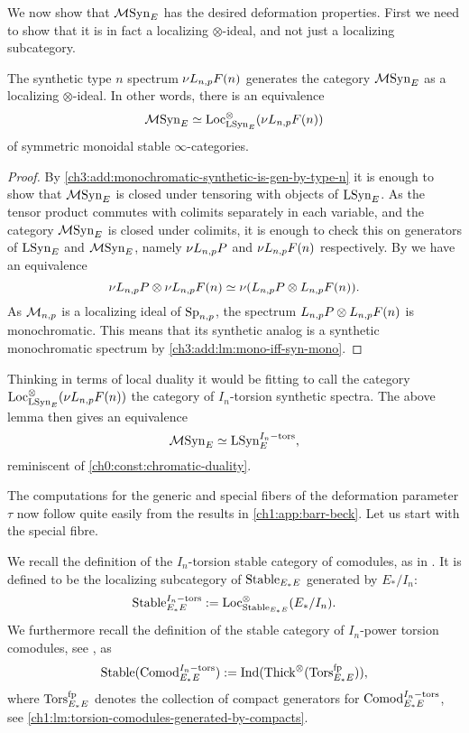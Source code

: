 We now show that $\mathcal{M}\mathrm{Syn}_{E}$ has the desired deformation properties. First we need to show that it is in fact a localizing $\otimes$-ideal, and not just a localizing subcategory. 

\begin{lemma}
    The synthetic type $n$ spectrum $\nu L_{n,p} F(n)$ generates the category $\mathcal{M}\mathrm{Syn}_{E}$ as a localizing $\otimes$-ideal. In other words, there is an equivalence 
    \[\mathcal{M}\mathrm{Syn}_{E} \simeq \operatorname{Loc}_{\mathrm{LSyn}_{E}}^\otimes(\nu L_{n,p} F(n))\] 
    of symmetric monoidal stable $\infty$-categories. 
\end{lemma}
\begin{proof}
    By \cref{ch3:add:monochromatic-synthetic-is-gen-by-type-n} it is enough to show that $\mathcal{M}\mathrm{Syn}_{E}$ is closed under tensoring with objects of $\mathrm{LSyn}_{E}$. As the tensor product commutes with colimits separately in each variable, and the category $\mathcal{M}\mathrm{Syn}_{E}$ is closed under colimits, it is enough to check this on generators of $\mathrm{LSyn}_{E}$ and $\mathcal{M}\mathrm{Syn}_{E}$, namely $\nu L_{n,p} P$ and $\nu L_{n,p} F(n)$ respectively. By \cite[4.24]{pstragowski_2022} we have an equivalence 
    \[\nu L_{n,p} P \otimes \nu L_{n,p} F(n) \simeq \nu(L_{n,p} P \otimes L_{n,p} F(n)).\]
    As $\mathcal{M}_{n,p}$ is a localizing ideal of $\mathrm{Sp}_{n,p}$, the spectrum $L_{n,p} P \otimes L_{n,p} F(n)$ is monochromatic. This means that its synthetic analog is a synthetic monochromatic spectrum by \cref{ch3:add:lm:mono-iff-syn-mono}. 
\end{proof}

\begin{remark}
    Thinking in terms of local duality it would be fitting to call the category $\operatorname{Loc}^\otimes_{\mathrm{LSyn}_{E}}(\nu L_{n,p} F(n))$ the category of $I_n$-torsion synthetic spectra. The above lemma then gives an equivalence 
    \[\mathcal{M}\mathrm{Syn}_{E} \simeq \mathrm{LSyn}_{E}^{I_n-\mathrm{tors}},\]
    reminiscent of \cref{ch0:const:chromatic-duality}. 
\end{remark}

The computations for the generic and special fibers of the deformation parameter $\tau$ now follow quite easily from the results in \cref{ch1:app:barr-beck}. Let us start with the special fibre. 

We recall the definition of the $I_n$-torsion stable category of comodules, as in \cite[2.4]{barthel-heard-valenzuela_2020}. It is defined to be the localizing subcategory of $\mathrm{Stable}_{E_*E}$ generated by $E_{*}/I_n$:
\[\mathrm{Stable}_{E_*E}^{I_n-\mathrm{tors}} := \operatorname{Loc}_{\mathrm{Stable}_{E_*E}}^\otimes(E_{*}/I_n).\] 
We furthermore recall the definition of the stable category of $I_n$-power torsion comodules, see \cite[3.5]{barthel-heard-valenzuela_2020}, as 
\[\mathrm{Stable}(\mathrm{Comod}_{E_*E}^{I_n-\mathrm{tors}}) := \operatorname{Ind}(\operatorname{Thick}^\otimes(\mathrm{Tors}_{E_*E}^{\mathrm{fp}})),\]
where $\mathrm{Tors}_{E_*E}^{\mathrm{fp}}$ denotes the collection of compact generators for $\mathrm{Comod}_{E_*E}^{I_n-\mathrm{tors}}$, see \cref{ch1:lm:torsion-comodules-generated-by-compacts}. 

